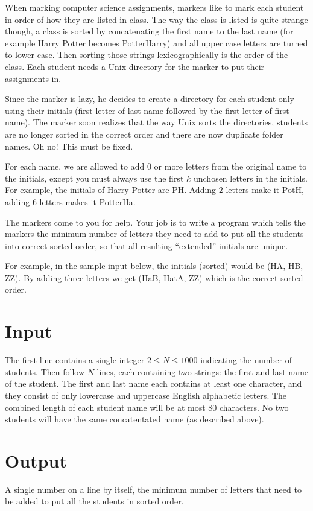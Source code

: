 

When marking computer science assignments, markers like to mark each
student in order of how they are listed in class. The way the class is
listed is quite strange though, a class is sorted by concatenating the
first name to the last name (for example Harry Potter becomes
PotterHarry) and all upper case letters are turned to lower case. Then
sorting those strings lexicographically is the order of the
class. Each student needs a Unix directory for the marker to put their
assignments in.

Since the marker is lazy, he decides to create a directory for each
student only using their initials (first letter of last name followed
by the first letter of first name). The marker soon realizes that the
way Unix sorts the directories, students are no longer sorted in the
correct order and there are now duplicate folder names. Oh no! This
must be fixed.

For each name, we are allowed to add $0$ or more letters from the
original name to the initials, except you must always use the first
$k$ unchosen letters in the initials. For example, the initials of
Harry Potter are PH. Adding $2$ letters make it PotH, adding $6$ letters
makes it PotterHa.

The markers come to you for help. Your job is to write a program which
tells the markers the minimum number of letters they need to add to
put all the students into correct sorted order, so that all resulting
``extended'' initials are unique.

For example, in the sample input below, the initials (sorted) would be
(HA, HB, ZZ).  By adding three letters we get (HaB, HatA, ZZ) which is
the correct sorted order.


\section*{Input}

The first line contains a single integer $2 \leq N \leq 1000$
indicating the number of students.  Then follow $N$ lines, each
containing two strings: the first and last name of the student.  The
first and last name each contains at least one character, and they
consist of only lowercase and uppercase English alphabetic letters.
The combined length of each student name will be at most $80$
characters.  No two students will have the same concatentated name (as
described above).

\section*{Output}

A single number on a line by itself, the minimum number of letters
that need to be added to put all the students in sorted order.
